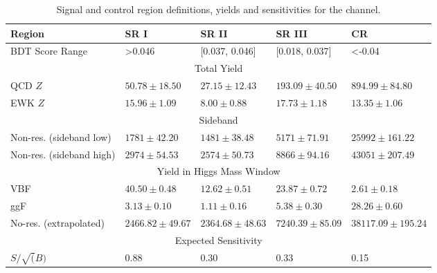 \begin{table}[htbp]
\centering
\caption{Signal and control region definitions, yields and sensitivities for the \twocentral channel. }
\label{tab:BDTReg2cen}
\begin{tabular}{|l|l|l|l|l|}
\hline
Region          & SR I               & SR II               & SR III             & CR                    \\ \hline
BDT Score Range & \textgreater0.046  & {[}0.037, 0.046{]}  & {[}0.018, 0.037{]} & \textless-0.04        \\ \hline
\multicolumn{5}{|c|}{Total Yield}                                                        \\ \hline
QCD $Z$ & $50.78 \pm 18.50$ & $27.15 \pm 12.43$ & $193.09 \pm 40.50$   &  $894.99 \pm 84.80$    \\ \cline{2-5} 
EWK $Z$&  $15.96 \pm 1.09$ &  $8.00 \pm 0.88$  & $17.73 \pm 1.18$  &  $13.35 \pm 1.06$    \\ \hline

\multicolumn{5}{|c|}{Sideband}  \\ \hline
Non-res. (sideband low)     & $1781 \pm 42.20$  & $1481 \pm 38.48 $ & $5171 \pm 71.91$ & $25992 \pm 161.22$    \\ \cline{2-5} 
Non-res. (sideband high)    & $2974 \pm 54.53$  & $2574 \pm 50.73 $ & $8866 \pm 94.16$ & $43051 \pm 207.49$    \\ \hline

\multicolumn{5}{|c|}{Yield in Higgs Mass Window}                                                        \\ \hline
VBF             & $40.50 \pm 0.48$   & $12.62\pm 0.51$     & $23.87\pm 0.72$    & $2.61 \pm 0.18$       \\ \cline{2-5} 
ggF             & $3.13 \pm 0.10$    & $1.11\pm 0.16$      & $5.38\pm 0.30$     & $28.26\pm 0.60$       \\ \cline{2-5}
No-res. (extrapolated)    & $2466.82 \pm 49.67$ & $2364.68 \pm 48.63$ & $7240.39\pm 85.09$ & $38117.09 \pm 195.24$ \\ \hline
\multicolumn{5}{|c|}{Expected Sensitivity}                                                              \\ \hline
$S/ \sqrt(B)$   & 0.88               & 0.30                & 0.33               & 0.15                  \\ \hline
\end{tabular}
\end{table}


